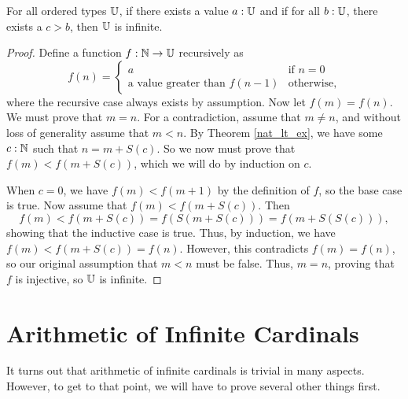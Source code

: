 \documentclass[../../math.tex]{subfiles}
\begin{document}
\begin{theorem} \label{all_greater_inf}
    For all ordered types $\mathbb{U}$, if there exists a value $a : \mathbb{U}$ and if for all
    $b : \mathbb{U}$, there exists a $c > b$, then $\mathbb{U}$ is infinite.
\end{theorem}
\begin{proof}
    Define a function $f : \mathbb{N} \to \mathbb{U}$ recursively as
    \[
        f(n) = \begin{cases}
            a & \text{if $n = 0$} \\
            \text{a value greater than $f(n-1)$} &\text{otherwise,}
        \end{cases}
    \]
    where the recursive case always exists by assumption.  Now let $f(m) =
    f(n)$.  We must prove that $m = n$.  For a contradiction, assume that $m
    \neq n$, and without loss of generality assume that $m < n$.  By Theorem
    \ref{nat_lt_ex}, we have some $c : \mathbb{N}$ such that $n = m + S(c)$.  So we now
    must prove that $f(m) < f(m + S(c))$, which we will do by induction on $c$.

    When $c = 0$, we have $f(m) < f(m + 1)$ by the definition of $f$, so the
    base case is true.  Now assume that $f(m) < f(m + S(c))$.  Then
    \[
        f(m) < f(m + S(c)) = f(S(m + S(c))) = f(m + S(S(c))),
    \]
    showing that the inductive case is true.  Thus, by induction, we have $f(m)
    < f(m + S(c)) = f(n)$.  However, this contradicts $f(m) = f(n)$, so our
    original assumption that $m < n$ must be false.  Thus, $m = n$, proving that
    $f$ is injective, so $\mathbb{U}$ is infinite.
\end{proof}

\section{Arithmetic of Infinite Cardinals}

It turns out that arithmetic of infinite cardinals is trivial in many aspects.
However, to get to that point, we will have to prove several other things first.
\end{document}
